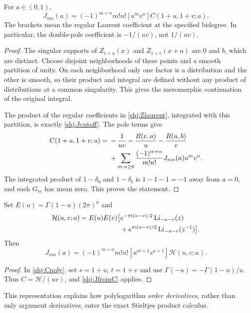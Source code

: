 \begin{proposition}\label{shj:Jcoefficient}
For $a\in(0,1)$,
\begin{equation}\label{shj:JfromC}
J_{mn}(a)=(-1)^{m+n}m!n![u^m v^n]C(1+u,1+v;a).
\end{equation}
The brackets mean the regular Laurent coefficient at the specified bidegree. In particular, the double-pole coefficient is $-1/(uv)$, not $1/(uv)$.
\end{proposition}
\begin{proof}
The singular supports of $Z_{1+u}(x)$ and $Z_{1+v}(x+a)$ are $0$ and $b$, which are distinct. Choose disjoint neighborhoods of these points and a smooth partition of unity. On each neighborhood only one factor is a distribution and the other is smooth, so their product and integral are defined without any product of distributions at a common singularity. This gives the meromorphic continuation of the original integral.

The product of the regular coefficients in \eqref{shj:Zlaurent}, integrated with this partition, is exactly \eqref{shj:Jcutoff}. The pole terms give
\begin{align}
C(1+u,1+v;a)={}&-\frac1{uv}-\frac{R(v,a)}u-\frac{R(u,b)}v\notag\\
&+\sum_{m,n\ge0}\frac{(-1)^{m+n}}{m!n!}J_{mn}(a)u^mv^n.
\label{shj:fullLaurent}
\end{align}
The integrated product of $1-\delta_0$ and $1-\delta_b$ is $1-1-1=-1$ away from $a=0$, and each $G_m$ has mean zero. This proves the statement.
\end{proof}

\begin{corollary}\label{shj:polygen}
Set $E(u)=\Gamma(1-u)(2\pi)^u$ and
\begin{align}
\mathcal H(u,v;a)=E(u)E(v)\big[&e^{-\pi\mathrm{i}(u-v)/2}\operatorname{Li}_{-u-v}(z)\notag\\
&+e^{\pi\mathrm{i}(u-v)/2}\operatorname{Li}_{-u-v}(z^{-1})\big].
\label{shj:H}
\end{align}
Then
\begin{equation}\label{shj:Jpoly}
J_{mn}(a)=(-1)^{m+n}m!n![u^{m+1}v^{n+1}]\mathcal H(u,v;a).
\end{equation}
\end{corollary}
\begin{proof}
In \eqref{shj:Cpoly}, set $s=1+u$, $t=1+v$ and use $\Gamma(-u)=-\Gamma(1-u)/u$. Thus $C=\mathcal H/(uv)$, and \eqref{shj:JfromC} applies.
\end{proof}
This representation explains how polylogarithm \emph{order derivatives}, rather than only argument derivatives, enter the exact Stieltjes product calculus.

